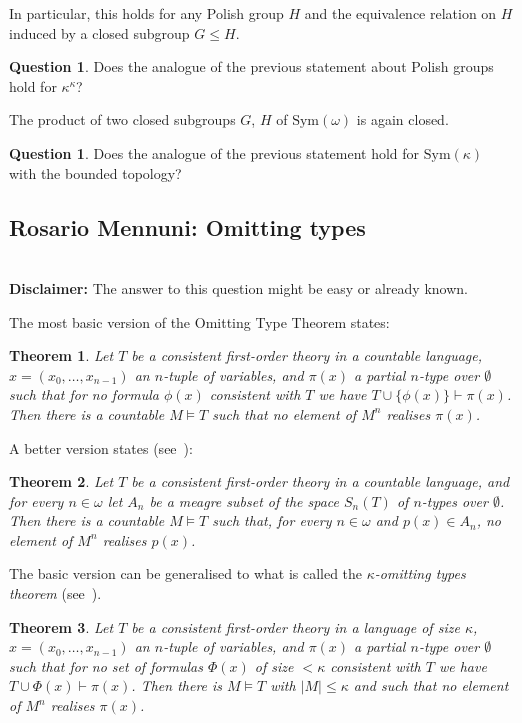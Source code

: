 \documentclass{amsart}
\newtheorem*{theorem*}{Theorem}
\theoremstyle{definition}
\newtheorem{question}[theorem]{Question}
\newcommand{\set}[1]{\lbrace#1\rbrace}
\begin{document}
In particular, this holds for any Polish group $H$ and the equivalence relation on $H$ induced by a closed subgroup $G\leq H$. 

\begin{question} 
Does the analogue of the previous statement about Polish groups hold for $\kappa^\kappa$? 
\end{question} 

The product of two closed subgroups $G$, $H$ of $\mathrm{Sym}(\omega)$ is again closed. 

\begin{question} 
Does the analogue of the previous statement hold for $\mathrm{Sym}(\kappa)$ with the bounded topology? 
\end{question} 


\subsection{Rosario Mennuni: Omitting types} \ \\ 

\noindent 
{\bf Disclaimer:}
The answer to this question might be easy or already known.

\smallskip 
The most basic version of the Omitting Type Theorem states:
\begin{theorem*}
  Let $T$ be a  consistent first-order theory in a countable language, $x=(x_0,\ldots,x_{n-1})$ an $n$-tuple of variables, and $\pi(x)$ a partial $n$-type over $\emptyset$ such that for no formula $\phi(x)$ consistent with $T$ we have $T\cup \set{\phi(x)}\vdash \pi(x)$. Then there is a countable  $M\models T$ such that no element of $M^n$ realises $\pi(x)$.
\end{theorem*}

A better version states (see~\cite[Theorem~10.3]{poizat}):

\begin{theorem*}\label{thm:ott_meagre}
  Let $T$ be a consistent first-order theory in a countable language, and for every $n\in \omega$ let $A_n$ be a meagre subset of the space $S_n(T)$ of $n$-types over $\emptyset$. Then there is a countable $M\models T$ such that, for every $n\in \omega$ and $p(x)\in A_n$, no element of $M^n$ realises $p(x)$.
\end{theorem*}

The basic version can be generalised to what is called the \emph{$\kappa$-omitting types theorem} (see~\cite[Theorem~2.2.19]{changkeisler}).

\begin{theorem*}\label{thm:kappaott}
  Let $T$ be a consistent first-order theory in a language of size $\kappa$, $x=(x_0,\ldots, x_{n-1})$ an $n$-tuple of variables, and $\pi(x)$ a  partial $n$-type over $\emptyset$ such that for no set of formulas $\Phi(x)$ of size $<\kappa$  consistent with $T$ we have $T\cup \Phi(x)\vdash \pi(x)$. Then there is $M\models T$ with $|M|\le \kappa$ and such that no element of $M^n$ realises $\pi(x)$.
\end{theorem*}
\end{document}
